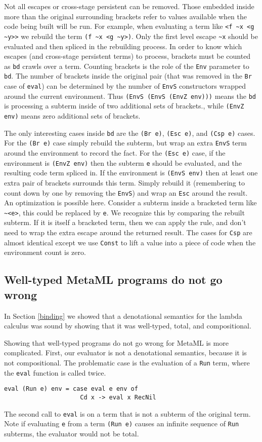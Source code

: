 \documentclass{sigplanconf}
\begin{document}
Not all escapes or cross-stage persistent can be removed. Those embedded
inside more than the original surrounding brackets refer to values available
when the code being built will be run. For example, when evaluating a term
like \verb+<f ~x <g ~y>>+ we rebuild the term  \verb+(f ~x <g ~y>)+. Only the
first level escape \verb+~x+ should be evaluated and then spliced in the rebuilding process. In
order to know which escapes (and cross-stage persistent terms) to process,
brackets must be counted as {\tt bd} crawls over a term. Counting brackets is the role of the
{\tt Env} parameter to {\tt bd}. The number of brackets inside the original
pair (that was removed in the {\tt Br} case of {\tt eval}) can be determined by the
number of {\tt EnvS} constructors wrapped around the current environment. Thus
\verb+(EnvS (EnvS (EnvZ env)))+ means the {\tt bd} is processing a subterm
inside of two additional sets of brackets., while \verb+(EnvZ env)+ means zero
additional sets of brackets.

The only interesting cases inside {\tt bd} are the {\tt (Br e)}, {\tt (Esc e)},
and {\tt (Csp e)} cases. For the {\tt (Br e)} case simply rebuild the
subterm, but wrap an extra {\tt EnvS} term around the environment to
record the fact. For the {\tt (Esc e)} case, if the environment
is {\tt (EnvZ env)} then the subterm {\tt e} should be evaluated,
and the resulting code term spliced in. If the environment
is {\tt (EnvS env)} then at least one extra pair of brackets surrounds
this term. Simply rebuild it (remembering to count down by one by removing
the {\tt EnvS}) and wrap an {\tt Esc} around the result. An optimization
is possible here. Consider a subterm inside a bracketed term
like \verb+~<e>+, this could be replaced by \verb+e+. We recognize
this by comparing the rebuilt subterm. If it is itself a bracketed term,
then we can apply the rule, and don't need to wrap the extra escape around
the returned result. The cases for {\tt Csp} are almost identical
except we use {\tt Const} to lift a value into a piece of code when
the environment count is zero.

\subsection{Well-typed MetaML programs do not go wrong}

In Section \ref{binding} we showed that a denotational semantics for
the lambda calculus was sound by showing that it was well-typed,
total, and compositional. 

Showing that well-typed programs do not go wrong for MetaML is
more complicated. First, our evaluator is not a denotational
semantics, because it is not compositional. The problematic case is
the evaluation of a {\tt Run} term, where the {\tt eval} function
is called twice.
\begin{verbatim}
eval (Run e) env = case eval e env of 
                     Cd x -> eval x RecNil
\end{verbatim}
The second call to {\tt eval} is on a term that is not a subterm of the original term. Note if
evaluating {\tt e} from a term {\tt (Run e)} causes an infinite sequence of
{\tt Run} subterms, the evaluator would not be total. 
\end{document}
